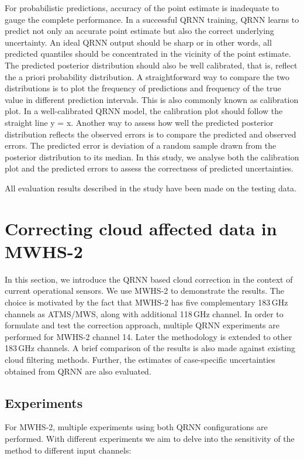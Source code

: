 \documentclass[amt, manuscript]{copernicus}
\begin{document}
For probabilistic predictions, accuracy of the point estimate is inadequate to gauge the complete performance. In a successful QRNN training, QRNN learns to predict not only an accurate point estimate but also the correct underlying uncertainty. An ideal QRNN output should be sharp or in other words, all predicted quantiles should be concentrated in the vicinity of the point estimate. The predicted posterior distribution should also be well calibrated, that is, reflect the a priori probability distribution. A straightforward way to compare the two distributions is to plot the frequency of predictions and frequency of the true value in different prediction intervals. This is also commonly known as calibration plot. In a well-calibrated QRNN model, the calibration plot should follow the straight line y = x. Another way to assess how well the predicted posterior distribution reflects the observed errors is to compare the predicted and observed errors. The predicted error is deviation of a random sample drawn from the posterior distribution to its median. In this study, we analyse both the calibration plot and the predicted errors to assess the correctness of predicted uncertainties.  

All evaluation results described in the study have been made on the testing data.


\section{Correcting cloud affected data in MWHS-2}
\label{qrnn_mwhs}
%
In this section, we introduce the QRNN based cloud  correction in the context of current operational sensors.  We use MWHS-2 to demonstrate the results. The choice is motivated by the fact that MWHS-2 has five complementary 183\,GHz channels as ATMS/MWS, along with additional 118\,GHz channel. In order to formulate and test the correction approach, multiple QRNN experiments are performed for MWHS-2 channel 14. Later the methodology is extended to other 183\,GHz channels. A brief comparison of the results is also made against existing cloud filtering methods. Further, the estimates of case-specific uncertainties obtained from QRNN are also evaluated.

\subsection{Experiments}
%
For MWHS-2, multiple experiments using both QRNN configurations are performed. With different experiments we aim to delve into the sensitivity of the method to different input channels:
\end{document}
